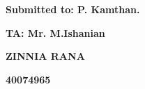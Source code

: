 \documentclass[12pt]{report}
\begin{document}
\vspace{\baselineskip}

\vspace{\baselineskip}

\vspace{\baselineskip}

\vspace{\baselineskip}

\vspace{\baselineskip}

\vspace{\baselineskip}
\begin{FlushRight}
\textbf{Submitted to: \textcolor[HTML]{2F5496}{P. Kamthan.}}
\end{FlushRight}\par

\begin{FlushRight}
\textbf{TA: \textcolor[HTML]{2F5496}{Mr. M.Ishanian}}
\end{FlushRight}\par

\begin{FlushRight}
\textbf{\textcolor[HTML]{2F5496}{ZINNIA RANA}}
\end{FlushRight}\par

\begin{FlushRight}
\textbf{\textcolor[HTML]{2F5496}{40074965}}
\end{FlushRight}\par


\vspace{\baselineskip}

\vspace{\baselineskip}

\vspace{\baselineskip}

\vspace{\baselineskip}

\vspace{\baselineskip}

\vspace{\baselineskip}

\vspace{\baselineskip}

\vspace{\baselineskip}

\vspace{\baselineskip}

\vspace{\baselineskip}
\end{document}

